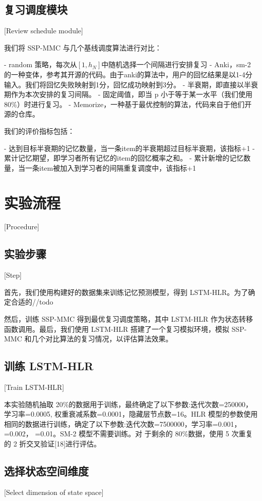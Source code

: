 \subsection{复习调度模块}[Review schedule module]

我们将 SSP-MMC 与几个基线调度算法进行对比：

- random 策略，每次从$[1,h_N]$中随机选择一个间隔进行安排复习
- Anki，sm-2 的一种变体，参考其开源的代码。由于anki的算法中，用户的回忆结果是以1-4分输入。我们将回忆失败映射到1分，回忆成功映射到3分。
- 半衰期，即直接以半衰期作为本次安排的复习间隔。
- 固定阈值，即当 p 小于等于某一水平（我们使用80\%）时进行复习。
- Memorize，一种基于最优控制的算法，代码来自于他们开源的仓库。

我们的评价指标包括：

- 达到目标半衰期的记忆数量，当一条item的半衰期超过目标半衰期，该指标+1
- 累计记忆期望，即学习者所有记忆的item的回忆概率之和。
- 累计新增的记忆数量，当一条item被加入到学习者的间隔重复调度中，该指标+1

\section{实验流程}[Procedure]

\subsection{实验步骤}[Step]

首先，我们使用构建好的数据集来训练记忆预测模型，得到 LSTM-HLR。为了确定合适的//todo

然后，训练 SSP-MMC 得到最优复习调度策略，其中 LSTM-HLR 作为状态转移函数调用。最后，我们使用 LSTM-HLR 搭建了一个复习模拟环境，模拟 SSP-MMC 和几个对比算法的复习情况，以评估算法效果。

\subsection{训练 LSTM-HLR}[Train LSTM-HLR]

本实验随机抽取 20\%的数据用于训练，最终确定了以下参数:迭代次数=250000，学习率=0.0005, 权重衰减系数=0.0001，隐藏层节点数=16。HLR 模型的参数使用相同的数据进行训练，确定了以下参数:迭代次数=7500000，学习率=0.001， =0.002， =0.01。SM-2 模型不需要训练。对 于剩余的 80\%数据，使用 5 次重复的 2 折交叉验证[18]进行评估。

\subsection{选择状态空间维度}[Select dimension of state space]

